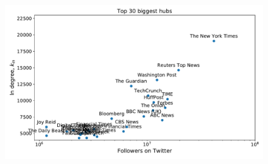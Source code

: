 \documentclass[11pt, twoside]{report}
\begin{document}
    \begin{figure}[htbp]
      \centering
      \includegraphics[width=\textwidth]{../../scripts/network_analysis/imgs/hubs_followers.pdf}            
      \caption{}
      \label{fig:hubs_followers}
    \end{figure}
\end{document}
